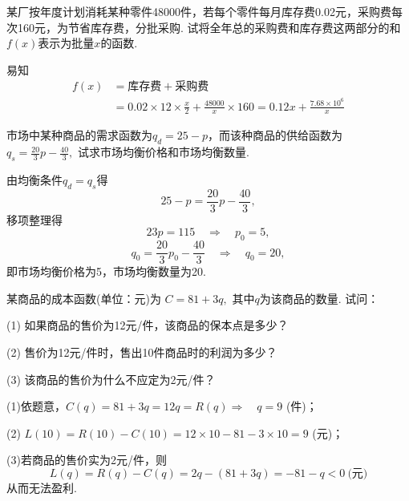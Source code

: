 \begin{problem}某厂按年度计划消耗某种零件48000件，若每个零件每月库存费0.02元，采购费每次160元，为节省库存费，分批采购.
	试将全年总的采购费和库存费这两部分的和$f\left( x \right)$表示为批量$x$的函数.
	
	\begin{solution} 		
		易知
		\begin{equation*}
		\begin{split}
		f\left( x \right) &=\text{库存费}+\text{采购费}\\
		&= 0.02 \times 12 \times \frac{x}{2} + \frac{48000}{x} \times 160 = 0.12x + \frac{7.68 \times 10^{6}}{x}
		\end{split}
		\end{equation*}
	\end{solution}   
\end{problem}    

\begin{problem}
	市场中某种商品的需求函数为$q_{d} = 25 - p$，而该种商品的供给函数为
	$\displaystyle q_{s} = \frac{20}{3}p - \frac{40}{3},$
	试求市场均衡价格和市场均衡数量.
	
	\begin{solution} 由均衡条件$q_{d} = q_{s}$得
		$$25 - p = \frac{20}{3}p - \frac{40}{3},$$
		移项整理得 $$23p = 115\quad \Rightarrow \quad p_{0} = 5,$$
		$$q_{0} = \frac{20}{3}p_{0} - \frac{40}{3}\quad \Rightarrow \quad q_{0} = 20,$$
		即市场均衡价格为5，市场均衡数量为20.
		
\end{solution}  
\end{problem} 



\begin{problem}某商品的成本函数(单位：元)为
	$C = 81 + 3q,$ 其中$q$为该商品的数量. 试问：
	
	(1) 如果商品的售价为12元/件，该商品的保本点是多少？
	
	(2) 售价为12元/件时，售出10件商品时的利润为多少？
	
	(3) 该商品的售价为什么不应定为2元/件？
	
	\begin{solution}
		(1)依题意，$C\left( q \right) = 81 + 3q = 12q = R\left( q \right)\Rightarrow \quad q = 9$ (件)；
		
		(2)
		$L\left( 10 \right) = R\left( 10 \right) - C\left( 10 \right) = 12 \times 10 - 81 - 3 \times 10 = 9$
		(元)；
		
		(3)若商品的售价实为2元/件，则
		$$L\left( q \right) = R\left( q \right) - C\left( q \right) = 2q - \left( 81 + 3q \right) = - 81 - q < 0\ \text{(元)}$$		
		从而无法盈利.
		
	\end{solution}   
\end{problem} 

